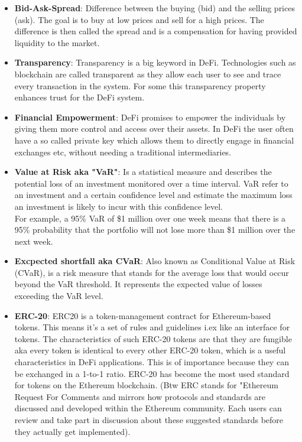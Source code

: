 \documentclass{article}
\begin{document}
\begin{itemize}
    \item \textbf{Bid-Ask-Spread}: Difference between the buying (bid) and the selling prices (ask). The goal is to buy at low prices and sell for a high prices. The difference is then called the spread and is a compensation for having provided liquidity to the market.
        
    \item \textbf{Transparency}: Transparency is a big keyword in DeFi. Technologies such as blockchain are called transparent as they allow each user to see and trace every transaction in the system. For some this transparency property enhances trust for the DeFi system.

    
     \item \textbf{Financial Empowerment}: DeFi promises to empower the individuals by giving them more control and access over their assets. In DeFi the user often have a so called private key which allows them to directly engage in financial exchanges etc, without needing a traditional intermediaries.
    
    \item \textbf{Value at Risk aka "VaR"}: Is a statistical measure and describes the potential loss of an investment monitored over a time interval. VaR refer to an investment and a certain confidence level and estimate the maximum loss an investment is likely to incur with this confidence level.\\
    For example, a 95\% VaR of \$1 million over one week means that there is a 95\% probability that the portfolio will not lose more than \$1 million over the next week.

    \item \textbf{Excpected shortfall aka CVaR}:
    Also known as Conditional Value at Risk (CVaR), is a risk measure that stands for the average loss that would occur beyond the VaR threshold. It represents the expected value of losses exceeding the VaR level.  

    \item \textbf{ERC-20}: ERC20 is a token-management contract for Ethereum-based tokens. This means it's a set of rules and guidelines i.ex like an interface for tokens. The characteristics of such ERC-20 tokens are that they are fungible aka every token is identical to every other ERC-20 token, which is a useful characteristics in DeFi applications. This is of importance because they can be exchanged in a 1-to-1 ratio. ERC-20 has become the most used standard for tokens on the Ethereum blockchain.
    (Btw ERC stands for "Ethereum Request For Comments and mirrors how protocols and standards are discussed and developed within the Ethereum community. Each users can review and take part in discussion about these suggested standards before they actually get implemented). 


\end{itemize}
\end{document}
